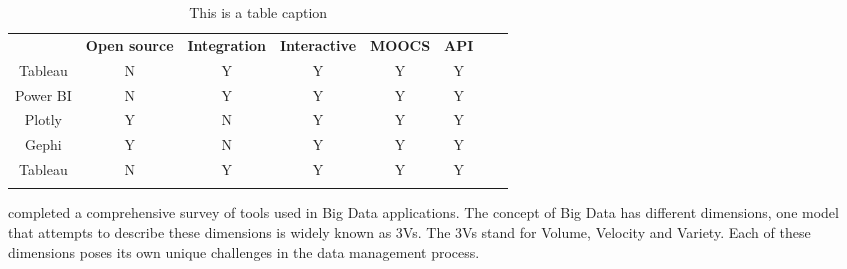 \begin{center}
	\begin{table}[H]
		\caption{This is a table caption}
		\label{fig:tool_comparison}
		\begin{tabular}{ 
				!{\vrule width 1.1pt}
				c!{\vrule width 1pt}
				c!{\vrule width 1pt}
				c!{\vrule width 1pt}
				c!{\vrule width 1pt}
				c!{\vrule width 1pt}
				c!{\vrule width 1pt}
				c!{\vrule width 1pt}
				c!{\vrule width 1pt}}
			 \textbf{} &
			 \textbf{Open source} &
			 \textbf{Integration} &
			 \textbf{Interactive} &
			 \textbf{MOOCS} &
			 \textbf{API}
			\\ 
			Tableau & N & Y & Y & Y & Y
			\\ \hline
			Power BI & N & Y & Y & Y & Y
			\\ \hline
			Plotly & Y & N & Y & Y & Y
			\\ \hline
			Gephi & Y & N & Y & Y & Y
			\\ \hline
			Tableau & N & Y & Y & Y & Y
			\\ 
		\end{tabular}
	\end{table}
\end{center}

\cite{caldarola2017big} completed a comprehensive survey of tools used in Big Data applications. The concept of Big Data has different dimensions, one model that attempts to describe these dimensions is widely known as 3Vs. The 3Vs stand for Volume, Velocity and Variety.  Each of these dimensions poses its own unique challenges in the data management process.

